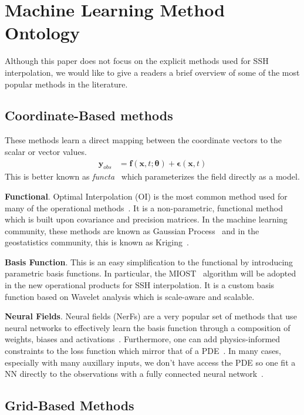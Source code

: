 \section{Machine Learning Method Ontology} \label{sec:ml_ontology}

Although this paper does not focus on the explicit methods used for SSH interpolation, we would like to give a readers a brief overview of some of the most popular methods in the literature.

\subsection{Coordinate-Based methods}

These methods learn a direct mapping between the coordinate vectors to the scalar or vector values. 
%
\begin{align}
    \boldsymbol{y}_{obs} &= \boldsymbol{f}(\mathbf{x},t;\boldsymbol{\theta})+\boldsymbol{\epsilon}(\mathbf{x},t)
\end{align}
%
This is better known as \textit{functa}~\cite{FUNCTA} which parameterizes the field directly as a model.

\textbf{Functional}. Optimal Interpolation (OI) is the most common method used for many of the operational methods~\cite{DUACS}. It is a non-parametric, functional method which is built upon covariance and precision matrices. In the machine learning community, these methods are known as Gaussian Process~\cite{GPsBIGDATA} and in the geostatistics community, this is known as Kriging~\cite{KRIGINGREVIEW}.

\textbf{Basis Function}. This is an easy simplification to the functional by introducing parametric basis functions. In particular, the MIOST~\cite{MIOST} algorithm will be adopted in the new operational products for SSH interpolation. It is a custom basis function based on Wavelet analysis which is scale-aware and scalable.

\textbf{Neural Fields}. Neural fields (NerFs) are a very popular set of methods that use neural networks to effectively learn the basis function through a composition of weights, biases and activations~\cite{NERFSSSH}.
Furthermore, one can add physics-informed constraints to the loss function which mirror that of a PDE~\cite{PINNS}.
In many cases, especially with many auxillary inputs, we don't have access the PDE so one fit a NN directly to the observations with a fully connected neural network~\cite{SOCAT}.


\subsection{Grid-Based Methods}

